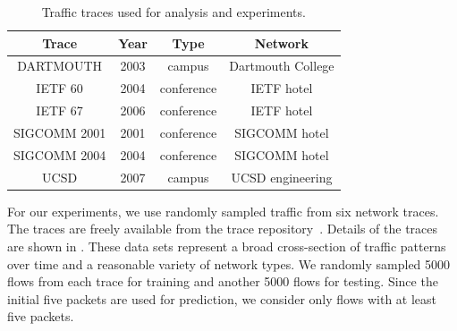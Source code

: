\documentclass{acm_proc_article-sp}
\begin{document}

\begin{table}
\vspace{0.25em}
\begin{center}
\small
\begin{tabular}{|c|c|c|c|}

\hline
\textbf{Trace} &
\textbf{Year} &
\textbf{Type} &
\textbf{Network} \\
\hline

{\scriptsize{DARTMOUTH}} &
2003 &
campus &
Dartmouth College \\
\hline

{\scriptsize{IETF 60}} &
2004 &
conference &
IETF hotel \\
\hline

{\scriptsize{IETF 67}} &
2006 &
conference &
IETF hotel \\
\hline

{\scriptsize{SIGCOMM 2001}} &
2001 &
conference &
SIGCOMM hotel \\
\hline

{\scriptsize{SIGCOMM 2004}} &
2004 &
conference &
SIGCOMM hotel \\
\hline

{\scriptsize{UCSD}} &
2007 &
campus &
UCSD engineering \\
\hline

\end{tabular}
\caption{Traffic traces used for analysis and experiments.}
\end{center}
\vspace{-2.5em}
\end{table}

For our experiments, we use randomly sampled traffic from six network traces.
The traces are freely available from the  trace repository~\cite{Yeo06}.
Details of the traces are shown in .
These data sets represent a broad cross-section of traffic patterns over time and a reasonable variety of network types.
We randomly sampled 5000 flows from each trace for training and another 5000 flows for testing.
Since the initial five packets are used for prediction, we consider only flows with at least five packets.
\end{document}
